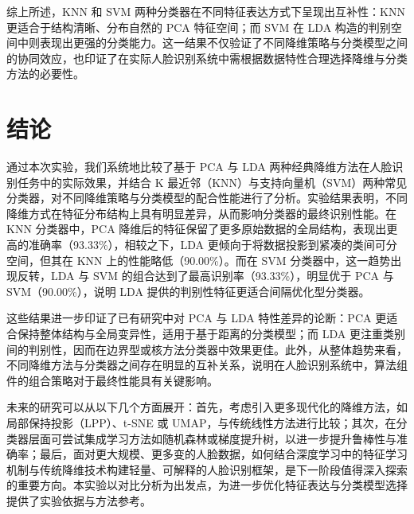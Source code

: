 \documentclass[a4paper, utf8]{ctexart}
\begin{document}
	综上所述，KNN 和 SVM 两种分类器在不同特征表达方式下呈现出互补性：KNN 更适合于结构清晰、分布自然的 PCA 特征空间；而 SVM 在 LDA 构造的判别空间中则表现出更强的分类能力。这一结果不仅验证了不同降维策略与分类模型之间的协同效应，也印证了在实际人脸识别系统中需根据数据特性合理选择降维与分类方法的必要性。
	
	\section{结论}
	
	通过本次实验，我们系统地比较了基于 PCA 与 LDA 两种经典降维方法在人脸识别任务中的实际效果，并结合 K 最近邻（KNN）与支持向量机（SVM）两种常见分类器，对不同降维策略与分类模型的配合性能进行了分析。实验结果表明，不同降维方式在特征分布结构上具有明显差异，从而影响分类器的最终识别性能。在 KNN 分类器中，PCA 降维后的特征保留了更多原始数据的全局结构，表现出更高的准确率（93.33\%），相较之下，LDA 更倾向于将数据投影到紧凑的类间可分空间，但其在 KNN 上的性能略低（90.00\%）。而在 SVM 分类器中，这一趋势出现反转，LDA 与 SVM 的组合达到了最高识别率（93.33\%），明显优于 PCA 与 SVM（90.00\%），说明 LDA 提供的判别性特征更适合间隔优化型分类器。
	
	这些结果进一步印证了已有研究中对 PCA 与 LDA 特性差异的论断\cite{pcavslda}：PCA 更适合保持整体结构与全局变异性，适用于基于距离的分类模型；而 LDA 更注重类别间的判别性，因而在边界型或核方法分类器中效果更佳。此外，从整体趋势来看，不同降维方法与分类器之间存在明显的互补关系，说明在人脸识别系统中，算法组件的组合策略对于最终性能具有关键影响。
	
	未来的研究可以从以下几个方面展开：首先，考虑引入更多现代化的降维方法，如局部保持投影（LPP）、t-SNE 或 UMAP，与传统线性方法进行比较；其次，在分类器层面可尝试集成学习方法如随机森林或梯度提升树，以进一步提升鲁棒性与准确率；最后，面对更大规模、更多变的人脸数据，如何结合深度学习中的特征学习机制与传统降维技术构建轻量、可解释的人脸识别框架，是下一阶段值得深入探索的重要方向。本实验以对比分析为出发点，为进一步优化特征表达与分类模型选择提供了实验依据与方法参考。
	
	\let\cleardoublepage\clearpage
	
\end{document}
